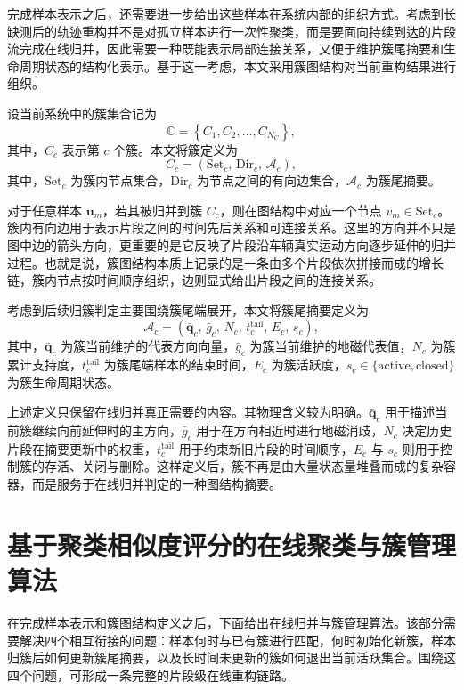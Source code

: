 \documentclass{xdupgthesis}
\begin{document}
完成样本表示之后，还需要进一步给出这些样本在系统内部的组织方式。考虑到长缺测后的轨迹重构并不是对孤立样本进行一次性聚类，而是要面向持续到达的片段流完成在线归并，因此需要一种既能表示局部连接关系，又便于维护簇尾摘要和生命周期状态的结构化表示。基于这一考虑，本文采用簇图结构对当前重构结果进行组织。

设当前系统中的簇集合记为
\begin{equation}
	\mathbb{C}=\left\{C_1,C_2,\ldots,C_{N_C}\right\},
\end{equation}
其中，$C_c$ 表示第 $c$ 个簇。本文将簇定义为
\begin{equation}
	C_c=
	\left(
	\mathrm{Set}_c,\,
	\mathrm{Dir}_c,\,
	\mathcal{A}_c
	\right),
\end{equation}
其中，$\mathrm{Set}_c$ 为簇内节点集合，$\mathrm{Dir}_c$ 为节点之间的有向边集合，$\mathcal{A}_c$ 为簇尾摘要。

对于任意样本 $\mathbf{u}_m$，若其被归并到簇 $C_c$，则在图结构中对应一个节点 $v_m\in\mathrm{Set}_c$。簇内有向边用于表示片段之间的时间先后关系和可连接关系。这里的方向并不只是图中边的箭头方向，更重要的是它反映了片段沿车辆真实运动方向逐步延伸的归并过程。也就是说，簇图结构本质上记录的是一条由多个片段依次拼接而成的增长链，簇内节点按时间顺序组织，边则显式给出片段之间的连接关系。

考虑到后续归簇判定主要围绕簇尾端展开，本文将簇尾摘要定义为
\begin{equation}
	\mathcal{A}_c=
	\left(
	\bar{\mathbf{q}}_c,\,
	\bar{g}_c,\,
	N_c,\,
	t_c^{\mathrm{tail}},\,
	E_c,\,
	s_c
	\right),
\end{equation}
其中，$\bar{\mathbf{q}}_c$ 为簇当前维护的代表方向向量，$\bar{g}_c$ 为簇当前维护的地磁代表值，$N_c$ 为簇累计支持度，$t_c^{\mathrm{tail}}$ 为簇尾端样本的结束时间，$E_c$ 为簇活跃度，$s_c\in\{\mathrm{active},\mathrm{closed}\}$ 为簇生命周期状态。

上述定义只保留在线归并真正需要的内容。其物理含义较为明确。$\bar{\mathbf{q}}_c$ 用于描述当前簇继续向前延伸时的主方向，$\bar{g}_c$ 用于在方向相近时进行地磁消歧，$N_c$ 决定历史片段在摘要更新中的权重，$t_c^{\mathrm{tail}}$ 用于约束新旧片段的时间顺序，$E_c$ 与 $s_c$ 则用于控制簇的存活、关闭与删除。这样定义后，簇不再是由大量状态量堆叠而成的复杂容器，而是服务于在线归并判定的一种图结构摘要。

\section{基于聚类相似度评分的在线聚类与簇管理算法}

在完成样本表示和簇图结构定义之后，下面给出在线归并与簇管理算法。该部分需要解决四个相互衔接的问题：样本何时与已有簇进行匹配，何时初始化新簇，样本归簇后如何更新簇尾摘要，以及长时间未更新的簇如何退出当前活跃集合。围绕这四个问题，可形成一条完整的片段级在线重构链路。
\end{document}
